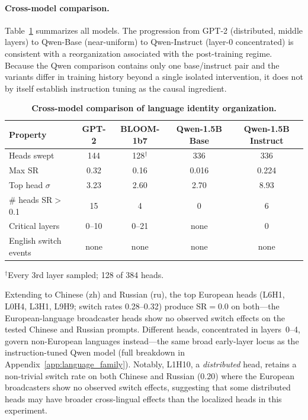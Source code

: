 \documentclass[11pt]{article}
\begin{document}
\paragraph{Cross-model comparison.} Table~\ref{tab:crossmodel}
summarizes all models. The progression from GPT-2 (distributed, middle layers) to Qwen-Base
(near-uniform) to Qwen-Instruct (layer-0 concentrated) is consistent with a
reorganization associated with the post-training regime. Because the Qwen
comparison contains only one base/instruct pair and the variants differ in
training history beyond a single isolated intervention, it does not by itself
establish instruction tuning as the causal ingredient.

\begin{table}[t]
\caption{\textbf{Cross-model comparison of language identity
organization.}}
\label{tab:crossmodel}
\centering\small
\begin{tabular}{lcccc}
\toprule
\textbf{Property} & \textbf{GPT-2} & \textbf{BLOOM-1b7} & \textbf{Qwen-1.5B Base} & \textbf{Qwen-1.5B Instruct} \\
\midrule
Heads swept       & 144   & 128$^{\dagger}$ & 336   & 336   \\
Max SR            & 0.32  & 0.16            & 0.016 & 0.224 \\
Top head $\sigma$ & 3.23  & 2.60            & 2.70  & 8.93  \\
\# heads SR$>$0.1 & 15    & 4               & 0     & 6     \\
Critical layers   & 0--10 & 0--21           & none  & 0     \\
English switch events & none & none & none & none \\
\bottomrule
\end{tabular}
\smallskip

{\footnotesize $^{\dagger}$Every 3rd layer sampled; 128 of 384 heads.}
\end{table}

\label{sec:extended}
Extending to Chinese (zh) and Russian (ru), the top European heads
(L6H1, L0H4, L3H1, L9H9; switch rates 0.28--0.32) produce SR$=$0.0 on
both---the European-language broadcaster heads show no observed switch effects on
the tested Chinese and Russian prompts. Different heads, concentrated in layers~0--4, govern
non-European languages instead---the same broad early-layer locus as
the instruction-tuned Qwen model (full breakdown in
Appendix~\ref{app:language_family}). Notably, L1H10, a \emph{distributed}
head, retains a non-trivial switch rate on both Chinese and Russian
(0.20) where the European broadcasters show no observed switch effects,
suggesting that some distributed heads may have broader cross-lingual effects
than the localized heads in this experiment.
\end{document}
